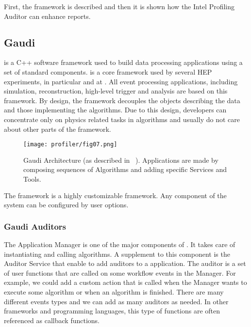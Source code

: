 First, the \gaudi framework is described and then it is shown how the \gaudi Intel
Profiling Auditor can enhance \amp reports.

\subsection{Gaudi}
\label{sec:gaudi}
\gaudi is a C++ software framework used to build data processing
applications using a set of standard components. \gaudi is a core framework used
by several HEP experiments, in particular \lhcb and \atlas at \lhc. All 
event processing applications, including simulation, reconstruction, high-level
trigger and analysis are based on this framework. By design, the framework
decouples the objects  describing the data and those implementing the
algorithms. Due to this design,  developers can concentrate only on  physics
related tasks in algorithms and usually do not care about other parts of the
framework.

\begin{figure}[H]
\begin{minipage}{\textwidth}
\texttt{[image: profiler/fig07.png]}
\caption{\label{fig07}Gaudi Architecture (as described in
~\cite{Barrand:2001ny}). Applications are made by composing sequences of
Algorithms and adding specific Services and Tools.}
\end{minipage}
\end{figure}

The \gaudi framework is a highly customizable framework. Any component of the
system can be configured by user options.

\subsubsection{Gaudi Auditors}

The Application Manager is one of the major components of \gaudi. It takes care
of instantiating and calling algorithms. A supplement to this component  is the
Auditor Service that enable to add auditors to a \gaudi application. The auditor
is a set of user functions that are called on some workflow events in the
Manager. For example, we could add a custom action that is called when the
Manager wants to execute some algorithm or when an algorithm is finished. There
are many different events types and we can add as many auditors as needed. In
other frameworks and programming languages, this type of functions are often
referenced as callback functions.


